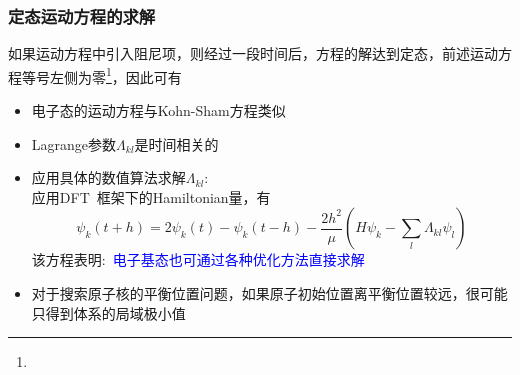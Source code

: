 {\frame
{
	\frametitle{定态运动方程的求解}
	如果运动方程中引入阻尼项，则经过一段时间后，方程的解达到定态，前述运动方程等号左侧为零\footnote{\fontsize{6.2pt}{5.2pt}\selectfont{定态，意味着波函数和原子位置不再随时间变化}}，因此可有
\begin{itemize}
	\item 电子态的运动方程与\textrm{Kohn-Sham}方程类似\\
		{\fontsize{6.2pt}{5.2pt}}
	\item \textrm{Lagrange}参数$\Lambda_{kl}$是时间相关的\\
		{\fontsize{6.2pt}{5.2pt}}
	\item 应用具体的数值算法求解$\Lambda_{kl}$:~\\
	{\fontsize{6.5pt}{5.2pt}\selectfont
	应用\textrm{DFT~}框架下的\textrm{Hamiltonian}量，有
	\begin{displaymath}
		\psi_k(t+h)=2\psi_k(t)-\psi_k(t-h)-\dfrac{2h^2}{\mu}(H\psi_k-\sum_l\Lambda_{kl}\psi_l)
	\end{displaymath}
	该方程表明:~\textcolor{blue}{电子基态也可通过各种优化方法直接求解}}\\
		{\fontsize{6.2pt}{5.2pt}}
	\item 对于搜索原子核的平衡位置问题，如果原子初始位置离平衡位置较远，很可能只得到体系的局域极小值\\
		{\fontsize{6.2pt}{5.2pt}\selectfont{使用模拟退火方法，使体系跃出局域极小点，搜索全局极小值}}
\end{itemize}
}

}
